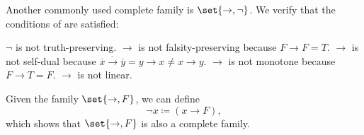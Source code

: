\begin{example}
\begin{exenum}
     Another commonly used complete family is \( \set{ \to, \neg } \).
    We verify that the conditions of  are satisfied:
    \begin{RefList}
       \( \neg \) is not truth-preserving.
       \( \to \) is not falsity-preserving because \( F \to F = T \).
       \( \to \) is not self-dual because \( \overline{\overline{x} \to \overline{y}} = y \to x \neq x \to y \).
       \( \to \) is not monotone because \( F \to T = F \).
       \( \to \) is not linear.
    \end{RefList}

     Given the family \( \set{ \to, F } \), we can define
    \begin{equation}
      \neg x \coloneqq (x \to F),
    \end{equation}
    which shows that \( \set{ \to, F } \) is also a complete family.
  \end{exenum}
\end{example}
